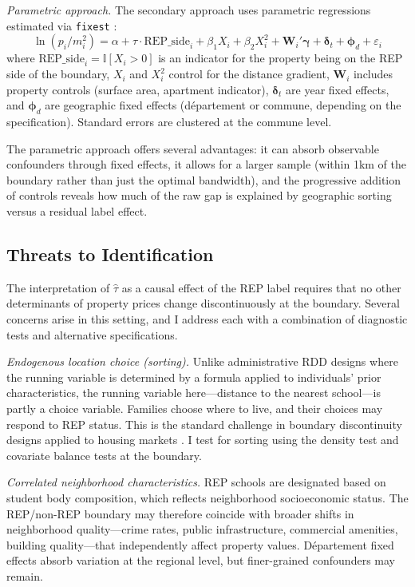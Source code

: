 \documentclass[12pt]{article}
\newcommand{\ind}{\mathbb{I}}
\begin{document}
\textit{Parametric approach.} The secondary approach uses parametric regressions estimated via \texttt{fixest} \citep{fixest}:
\begin{equation}\label{eq:parametric}
\ln(p_i / m^2_i) = \alpha + \tau \cdot \text{REP\_side}_i + \beta_1 X_i + \beta_2 X_i^2 + \mathbf{W}_i'\boldsymbol{\gamma} + \boldsymbol{\delta}_t + \boldsymbol{\phi}_d + \varepsilon_i
\end{equation}
where $\text{REP\_side}_i = \ind[X_i > 0]$ is an indicator for the property being on the REP side of the boundary, $X_i$ and $X_i^2$ control for the distance gradient, $\mathbf{W}_i$ includes property controls (surface area, apartment indicator), $\boldsymbol{\delta}_t$ are year fixed effects, and $\boldsymbol{\phi}_d$ are geographic fixed effects (d\'{e}partement or commune, depending on the specification). Standard errors are clustered at the commune level.

The parametric approach offers several advantages: it can absorb observable confounders through fixed effects, it allows for a larger sample (within 1km of the boundary rather than just the optimal bandwidth), and the progressive addition of controls reveals how much of the raw gap is explained by geographic sorting versus a residual label effect.

\subsection{Threats to Identification}

The interpretation of $\hat{\tau}$ as a causal effect of the REP label requires that no other determinants of property prices change discontinuously at the boundary. Several concerns arise in this setting, and I address each with a combination of diagnostic tests and alternative specifications.

\textit{Endogenous location choice (sorting).} Unlike administrative RDD designs where the running variable is determined by a formula applied to individuals' prior characteristics, the running variable here---distance to the nearest school---is partly a choice variable. Families choose where to live, and their choices may respond to REP status. This is the standard challenge in boundary discontinuity designs applied to housing markets \citep{black1999, bayer2007}. I test for sorting using the \citet{cattaneo2020} density test and covariate balance tests at the boundary.

\textit{Correlated neighborhood characteristics.} REP schools are designated based on student body composition, which reflects neighborhood socioeconomic status. The REP/non-REP boundary may therefore coincide with broader shifts in neighborhood quality---crime rates, public infrastructure, commercial amenities, building quality---that independently affect property values. D\'{e}partement fixed effects absorb variation at the regional level, but finer-grained confounders may remain.
\end{document}
